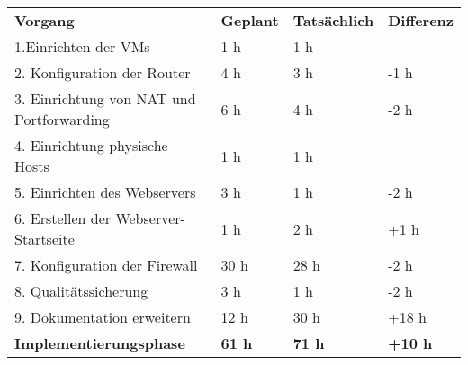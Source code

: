 \begin{tabular}{llll}
\rowcolor{heading}\textbf{Vorgang} & \textbf{Geplant} & \textbf{Tatsächlich} & \textbf{Differenz} \\
1.Einrichten der VMs & 1 h   & 1 h   &  \\
\rowcolor{odd}2. Konfiguration der Router & 4 h  & 3 h   & -1 h \\
3. Einrichtung von NAT und Portforwarding & 6 h  & 4 h  & -2 h \\
\rowcolor{odd}4. Einrichtung physische Hosts & 1 h   & 1 h   &  \\
5. Einrichten des Webservers & 3 h  & 1 h   & -2 h \\
\rowcolor{odd}6. Erstellen der Webserver-Startseite & 1 h   & 2 h   & +1 h \\
7. Konfiguration der Firewall & 30 h  & 28 h  & -2 h \\
\rowcolor{odd}8. Qualitätssicherung & 3 h   & 1 h   & -2 h  \\
9. Dokumentation erweitern & 12 h   & 30 h   & +18 h \\
\hline
\hline
\rowcolor{heading}\textbf{Implementierungsphase} & \textbf{61 h} & \textbf{71 h} & \textbf{+10 h} \\
\end{tabular}
